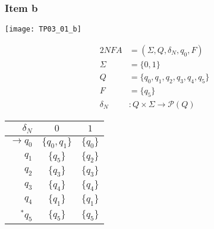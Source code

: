 {\subsubsection{Item b}
\begin{center} \texttt{[image: TP03\_01\_b]} \end{center}
\begin{center}
	\begin{minipage}[c]{0.30\textwidth}
		\begin{alignat*}{2}
			NFA       &= (\Sigma, Q, \delta_N, q_0, F)\\
			\Sigma    &= \{0,1\}\\
			Q         &= \{q_0,q_1,q_2,q_3,q_4,q_5\}\\
			F         &= \{q_5\}\\
			\delta_N &\colon Q \times \Sigma \rightarrow \mathscr{P}(Q)
		\end{alignat*}
	\end{minipage}
	\begin{minipage}[c]{0.25\textwidth}
		\begin{center}
		\begin{tabular}{ r | c c }
 			$\delta_N$ & $0$ & $1$ \\ \hline
 			$\rightarrow q_0$ & $\{q_0,q_1\}$ & $\{q_0\}$ \\  
 			$            q_1$ & $\{q_5    \}$ & $\{q_2\}$ \\
 			$            q_2$ & $\{q_3    \}$ & $\{q_3\}$ \\
 			$            q_3$ & $\{q_4    \}$ & $\{q_4\}$ \\
 			$            q_4$ & $\{q_1    \}$ & $\{q_1\}$ \\
 			$      ^\ast q_5$ & $\{q_5    \}$ & $\{q_5\}$ 
		\end{tabular}
		\end{center}
	\end{minipage}
\end{center}
\pagebreak
}
